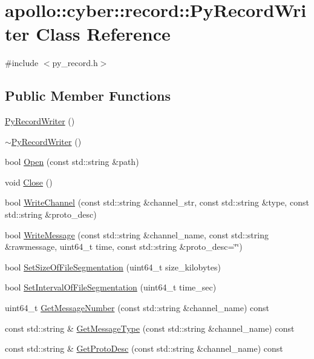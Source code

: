 \hypertarget{classapollo_1_1cyber_1_1record_1_1PyRecordWriter}{\section{apollo\-:\-:cyber\-:\-:record\-:\-:Py\-Record\-Writer Class Reference}
\label{classapollo_1_1cyber_1_1record_1_1PyRecordWriter}
}


{\ttfamily \#include $<$py\-\_\-record.\-h$>$}

\subsection*{Public Member Functions}
\begin{DoxyCompactItemize}
\item 
\hyperlink{classapollo_1_1cyber_1_1record_1_1PyRecordWriter_a9fbd7bdbfb251a59d90dd1535ffeac5e}{Py\-Record\-Writer} ()
\item 
\hyperlink{classapollo_1_1cyber_1_1record_1_1PyRecordWriter_a278d241db74c545354877944f3ae665b}{$\sim$\-Py\-Record\-Writer} ()
\item 
bool \hyperlink{classapollo_1_1cyber_1_1record_1_1PyRecordWriter_a461eea566b4447da72f8b3bcb8c03244}{Open} (const std\-::string \&path)
\item 
void \hyperlink{classapollo_1_1cyber_1_1record_1_1PyRecordWriter_a718ea73418d44d10179cf95ab60ccc8d}{Close} ()
\item 
bool \hyperlink{classapollo_1_1cyber_1_1record_1_1PyRecordWriter_a00f9e052511947bf3f369005c29c0341}{Write\-Channel} (const std\-::string \&channel\-\_\-str, const std\-::string \&type, const std\-::string \&proto\-\_\-desc)
\item 
bool \hyperlink{classapollo_1_1cyber_1_1record_1_1PyRecordWriter_a0eb33ce4ca06646085190502dd423564}{Write\-Message} (const std\-::string \&channel\-\_\-name, const std\-::string \&rawmessage, uint64\-\_\-t time, const std\-::string \&proto\-\_\-desc=\char`\"{}\char`\"{})
\item 
bool \hyperlink{classapollo_1_1cyber_1_1record_1_1PyRecordWriter_a6715e3d11febf8811b4f149edf33dd54}{Set\-Size\-Of\-File\-Segmentation} (uint64\-\_\-t size\-\_\-kilobytes)
\item 
bool \hyperlink{classapollo_1_1cyber_1_1record_1_1PyRecordWriter_ac1d7638bf4dac0b2d8f744178f6620cf}{Set\-Interval\-Of\-File\-Segmentation} (uint64\-\_\-t time\-\_\-sec)
\item 
uint64\-\_\-t \hyperlink{classapollo_1_1cyber_1_1record_1_1PyRecordWriter_a83a48265d06992510ccbc3137c261da5}{Get\-Message\-Number} (const std\-::string \&channel\-\_\-name) const 
\item 
const std\-::string \& \hyperlink{classapollo_1_1cyber_1_1record_1_1PyRecordWriter_a8328864e885992d02d55def76884ae87}{Get\-Message\-Type} (const std\-::string \&channel\-\_\-name) const 
\item 
const std\-::string \& \hyperlink{classapollo_1_1cyber_1_1record_1_1PyRecordWriter_a629a32f83f3ccd84f7af509ad9b675f7}{Get\-Proto\-Desc} (const std\-::string \&channel\-\_\-name) const 
\end{DoxyCompactItemize}
